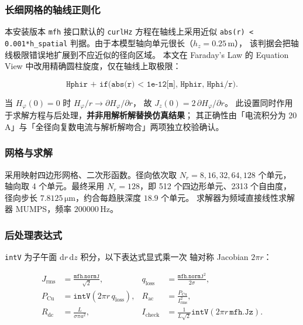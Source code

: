 \documentclass[12pt, a4paper]{ctexart}
\newcommand{\Rac}{R_{\mathrm{ac}}}
\newcommand{\Rdc}{R_{\mathrm{dc}}}
\newcommand{\U}[1]{\ensuremath{\,\mathrm{#1}}}
\begin{document}
\subsubsection{长细网格的轴线正则化}

本安装版本 \texttt{mfh} 接口默认的 \texttt{curlHz} 方程在轴线上采用近似
\texttt{abs(r) < 0.001*h\_spatial} 判据。由于本模型轴向单元很长（$h_z = 0.25\U{m}$），
该判据会把轴线极限错误地扩展到不应近似的径向区域。
本文在 Faraday's Law 的 Equation View 中改用精确圆柱旋度，仅在轴线上取极限：

\begin{equation}
\texttt{Hphir + if(abs(r) < 1e-12[m], Hphir, Hphi/r)} .
\end{equation}

当 $H_\varphi(0) = 0$ 时 $H_\varphi/r \to \partial H_\varphi/\partial r$，
故 $J_z(0) = 2\,\partial H_\varphi/\partial r$。
此设置同时作用于求解方程与后处理，\textbf{并非用解析解替换仿真结果}；
其正确性由「电流积分为 20 A」与「全径向复数电流与解析解吻合」两项独立校验确认。

\subsubsection{网格与求解}

采用映射四边形网格、二次形函数。径向依次取 $N_r = 8,16,32,64,128$ 个单元，
轴向取 4 个单元。最终采用 $N_r = 128$，即 512 个四边形单元、2313 个自由度，
径向步长 $7.8125\U{\mu m}$，约合每趋肤深度 $18.9$ 个单元。
求解器为频域直接线性求解器 MUMPS，频率 $200000\U{Hz}$。

\subsubsection{后处理表达式}

\texttt{intV} 为子午面 $\mathrm{d}r\,\mathrm{d}z$ 积分，以下表达式显式乘一次
轴对称 Jacobian $2\pi r$：

\begin{equation}
\begin{aligned}
J_{\mathrm{rms}} &= \frac{\texttt{mfh.normJ}}{\sqrt2}, &
q_{\mathrm{loss}} &= \frac{\texttt{mfh.normJ}^2}{2\sigma}, \\
P_{\mathrm{Cu}} &= \texttt{intV}\!\left(2\pi r\, q_{\mathrm{loss}}\right), &
\Rac &= \frac{P_{\mathrm{Cu}}}{I_{\mathrm{rms}}^2}, \\
\Rdc &= \frac{L}{\sigma\pi a^2}, &
I_{\mathrm{check}} &= \frac{1}{L\sqrt2}\texttt{intV}\!\left(2\pi r\, \texttt{mfh.Jz}\right).
\end{aligned}
\label{eq:q1-post}
\end{equation}
\end{document}
